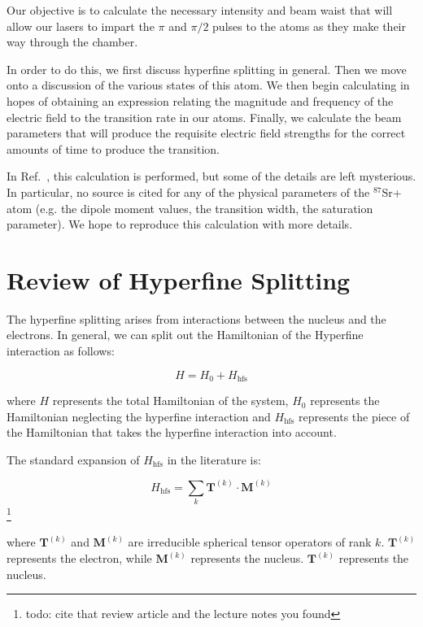 Our objective is to calculate the necessary intensity and beam waist that will allow our lasers to impart the $\pi$ and $\pi/2$ pulses to the atoms as they make their way through the chamber. 

In order to do this, we first discuss hyperfine splitting in general. Then we move onto a discussion of the various states of this atom. We then begin calculating in hopes of obtaining an expression relating the magnitude and frequency of the electric field to the transition rate in our atoms. Finally, we calculate the beam parameters that will produce the requisite electric field strengths for the correct amounts of time to produce the transition. 

In Ref.\ \cite{cjeDiss}, this calculation is performed, but some of the details are left mysterious. In particular, no source is cited for any of the physical parameters of the $^{87}$Sr+ atom (e.g. the dipole moment values, the transition width, the saturation parameter). We hope to reproduce this calculation with more details.  

\section{Review of Hyperfine Splitting}

The hyperfine splitting arises from interactions between the nucleus and the electrons. In general, we can split out the Hamiltonian of the Hyperfine interaction as follows: 

\begin{equation}
H=H_0+H_{\mathrm{hfs}}
\end{equation}

where $H$ represents the total Hamiltonian of the system, $H_0$ represents the Hamiltonian neglecting the hyperfine interaction and $H_{\mathrm{hfs}}$ represents the piece of the Hamiltonian that takes the hyperfine interaction into account. 

The standard expansion of $H_{\mathrm{hfs}}$ in the literature is:  

\begin{equation}
H_{\mathrm{hfs}}=\sum_k \mathbf{T}^{(k)} \cdot \mathbf{M}^{(k)} \label{hfs_hamiltonian_eqn}
\end{equation}
\cite{schwartz_hyperfine_expansion}
\cite{experimental_hyperfine_alkali_arimondo}
\cite{chinesePhysics}
\footnote{todo: cite that review article and the lecture notes you found}

where $\mathbf{T}^{(k)}$ and $\mathbf{M}^{(k)}$ are irreducible spherical tensor operators of rank $k$. $\mathbf{T}^{(k)}$ represents the electron, while $\mathbf{M}^{(k)}$ represents the nucleus. $\mathbf{T}^{(k)}$ represents the nucleus.

